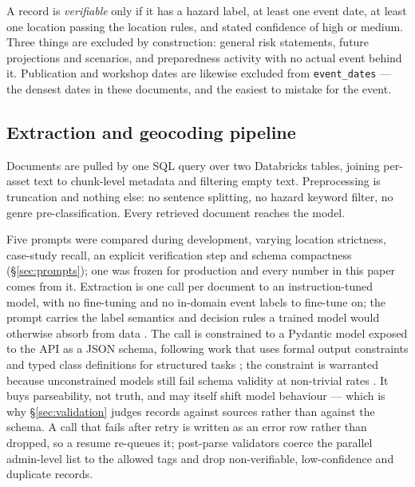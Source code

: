 A record is \emph{verifiable} only if it has a hazard label, at least one
event date, at least one location passing the location rules, and stated
confidence of high or medium. Three things are excluded by construction:
general risk statements, future projections and scenarios, and preparedness
activity with no actual event behind it. Publication and workshop dates are
likewise excluded from \texttt{event\_dates} --- the densest dates in these
documents, and the easiest to mistake for the event.

\subsection{Extraction and geocoding pipeline}
\label{ssec:pipeline}

Documents are pulled by one SQL query over two Databricks tables, joining
per-asset text to chunk-level metadata and filtering empty text. Preprocessing
is truncation and nothing else: no sentence splitting, no hazard keyword
filter, no genre pre-classification. Every retrieved document reaches the
model.



Five prompts were compared during development, varying location strictness,
case-study recall, an explicit verification step and schema compactness
(\S\ref{sec:prompts}); one was frozen for production and every number in this
paper comes from it. Extraction is one call per document to an
instruction-tuned model, with no fine-tuning and no in-domain event labels to
fine-tune on; the prompt carries the label semantics and decision rules a
trained model would otherwise absorb from data
\citep{sainz2024GoLLIE,jiao2023InstructIE}. The call is constrained to a
Pydantic model exposed to the API as a JSON schema, following work that uses
formal output constraints and typed class definitions for structured tasks
\citep{geng2023GrammarConstrained,wang2023Code4Struct}; the constraint is
warranted because unconstrained models still fail schema validity at
non-trivial rates \citep{lu2025SchemaRL}. It buys parseability, not truth, and
may itself shift model behaviour \citep{schall2025HiddenCost} --- which is why
\S\ref{sec:validation} judges records against sources rather than against the
schema. A call that fails after retry is written as an error row rather than
dropped, so a resume re-queues it; post-parse validators coerce the parallel
admin-level list to the allowed tags and drop non-verifiable, low-confidence
and duplicate records.

